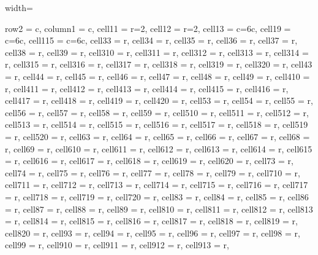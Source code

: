 \documentclass[journal]{IEEEtran}
\begin{document}
\begin{table}
\caption{Internal Similarity and Diversity metrics for experimental datasets.}
\centering
\begin{adjustbox}{width=\textwidth}
\begin{tblr}{
  row{2} = {c},  column{1} = {c}, cell{1}{1} = {r=2}{},  cell{1}{2} = {r=2}{},  cell{1}{3} = {c=6}{c},  cell{1}{9} = {c=6}{c},  cell{1}{15} = {c=6}{c},  cell{3}{3} = {r},  cell{3}{4} = {r},  cell{3}{5} = {r},  cell{3}{6} = {r},  cell{3}{7} = {r},  cell{3}{8} = {r},  cell{3}{9} = {r},  cell{3}{10} = {r},  cell{3}{11} = {r},  cell{3}{12} = {r},  cell{3}{13} = {r},  cell{3}{14} = {r},  cell{3}{15} = {r},  cell{3}{16} = {r},  cell{3}{17} = {r},  cell{3}{18} = {r},  cell{3}{19} = {r},  cell{3}{20} = {r},  cell{4}{3} = {r},  cell{4}{4} = {r},  cell{4}{5} = {r},  cell{4}{6} = {r},  cell{4}{7} = {r},  cell{4}{8} = {r},  cell{4}{9} = {r},  cell{4}{10} = {r},  cell{4}{11} = {r},  cell{4}{12} = {r},  
  cell{4}{13} = {r},  cell{4}{14} = {r},  cell{4}{15} = {r},  cell{4}{16} = {r},  cell{4}{17} = {r},  cell{4}{18} = {r},  cell{4}{19} = {r},  cell{4}{20} = {r},  cell{5}{3} = {r},  cell{5}{4} = {r},  cell{5}{5} = {r},  cell{5}{6} = {r},  cell{5}{7} = {r},  cell{5}{8} = {r},  cell{5}{9} = {r},  cell{5}{10} = {r},  cell{5}{11} = {r},  cell{5}{12} = {r},  cell{5}{13} = {r},  cell{5}{14} = {r},  cell{5}{15} = {r},  cell{5}{16} = {r},  cell{5}{17} = {r},  cell{5}{18} = {r},  cell{5}{19} = {r},  cell{5}{20} = {r},  cell{6}{3} = {r},  cell{6}{4} = {r},  
  cell{6}{5} = {r},  cell{6}{6} = {r},  cell{6}{7} = {r},  cell{6}{8} = {r},  cell{6}{9} = {r},  cell{6}{10} = {r},  cell{6}{11} = {r},  cell{6}{12} = {r},  cell{6}{13} = {r},  cell{6}{14} = {r},  cell{6}{15} = {r},  cell{6}{16} = {r},  cell{6}{17} = {r},  cell{6}{18} = {r},  cell{6}{19} = {r},  cell{6}{20} = {r},  cell{7}{3} = {r},  cell{7}{4} = {r},  cell{7}{5} = {r},  cell{7}{6} = {r},  cell{7}{7} = {r},  cell{7}{8} = {r},  cell{7}{9} = {r},  cell{7}{10} = {r},  cell{7}{11} = {r},  cell{7}{12} = {r},  cell{7}{13} = {r},  cell{7}{14} = {r},  cell{7}{15} = {r},  cell{7}{16} = {r},  cell{7}{17} = {r},  cell{7}{18} = {r},  cell{7}{19} = {r},  cell{7}{20} = {r},  cell{8}{3} = {r},  
  cell{8}{4} = {r},  cell{8}{5} = {r},  cell{8}{6} = {r},  cell{8}{7} = {r},  cell{8}{8} = {r},  cell{8}{9} = {r},  cell{8}{10} = {r},  cell{8}{11} = {r},  cell{8}{12} = {r},  cell{8}{13} = {r},  cell{8}{14} = {r},  cell{8}{15} = {r},  cell{8}{16} = {r},  cell{8}{17} = {r},  cell{8}{18} = {r},  cell{8}{19} = {r},  cell{8}{20} = {r},  cell{9}{3} = {r},  cell{9}{4} = {r},  cell{9}{5} = {r},  cell{9}{6} = {r},  cell{9}{7} = {r},  cell{9}{8} = {r},  cell{9}{9} = {r},  cell{9}{10} = {r},  cell{9}{11} = {r},  cell{9}{12} = {r},  cell{9}{13} = {r},  
}
\end{tblr}
\end{adjustbox}
\end{table}
\end{document}
